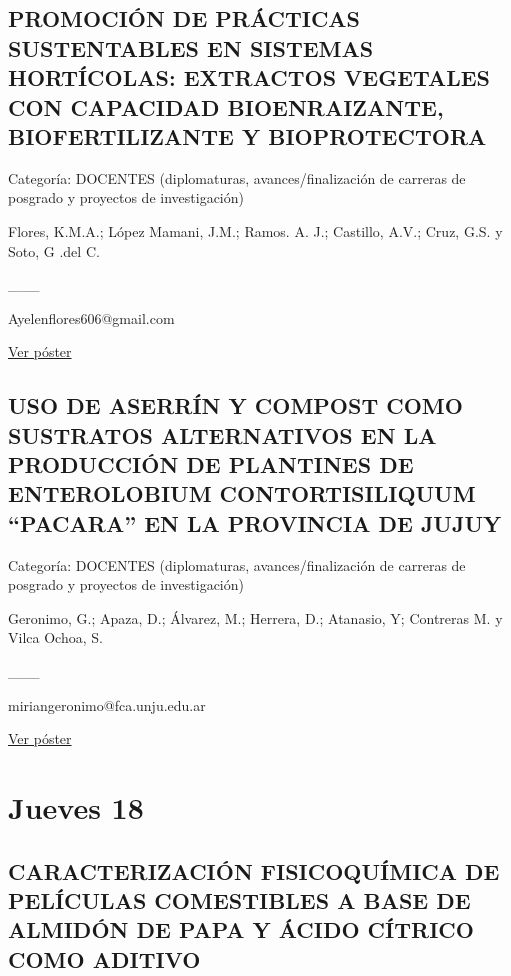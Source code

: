 \documentclass[
  spanish,
  letterpaper,
  DIV=11,
  numbers=noendperiod]{scrreprt}
\begin{document}
\section{PROMOCIÓN DE PRÁCTICAS SUSTENTABLES EN SISTEMAS HORTÍCOLAS:
EXTRACTOS VEGETALES CON CAPACIDAD BIOENRAIZANTE, BIOFERTILIZANTE Y
BIOPROTECTORA}\label{promociuxf3n-de-pruxe1cticas-sustentables-en-sistemas-hortuxedcolas-extractos-vegetales-con-capacidad-bioenraizante-biofertilizante-y-bioprotectora}

Categoría: DOCENTES (diplomaturas, avances/finalización de carreras de
posgrado y proyectos de investigación)

Flores, K.M.A.; López Mamani, J.M.; Ramos. A. J.; Castillo, A.V.; Cruz,
G.S. y Soto, G .del C.

\_\_\_

Ayelenflores606@gmail.com

\href{https://drive.google.com/open?id=1oijHVPpVQo6iicFIkyvhzOO7ZGD1Auuc}{Ver
póster}

\section{USO DE ASERRÍN Y COMPOST COMO SUSTRATOS ALTERNATIVOS EN LA
PRODUCCIÓN DE PLANTINES DE ENTEROLOBIUM CONTORTISILIQUUM ``PACARA'' EN
LA PROVINCIA DE
JUJUY}\label{uso-de-aserruxedn-y-compost-como-sustratos-alternativos-en-la-producciuxf3n-de-plantines-de-enterolobium-contortisiliquum-pacara-en-la-provincia-de-jujuy}

Categoría: DOCENTES (diplomaturas, avances/finalización de carreras de
posgrado y proyectos de investigación)

Geronimo, G.; Apaza, D.; Álvarez, M.; Herrera, D.; Atanasio, Y;
Contreras M. y Vilca Ochoa, S.

\_\_\_

miriangeronimo@fca.unju.edu.ar

\href{https://drive.google.com/open?id=1SNnutaTtcCr0zvVHpmrJB95YLzb2Ee4I}{Ver
póster}


\chapter{Jueves 18}\label{jueves-18-1}

\section{CARACTERIZACIÓN FISICOQUÍMICA DE PELÍCULAS COMESTIBLES A BASE
DE ALMIDÓN DE PAPA Y ÁCIDO CÍTRICO COMO
ADITIVO}\label{caracterizaciuxf3n-fisicoquuxedmica-de-peluxedculas-comestibles-a-base-de-almiduxf3n-de-papa-y-uxe1cido-cuxedtrico-como-aditivo}
\end{document}
